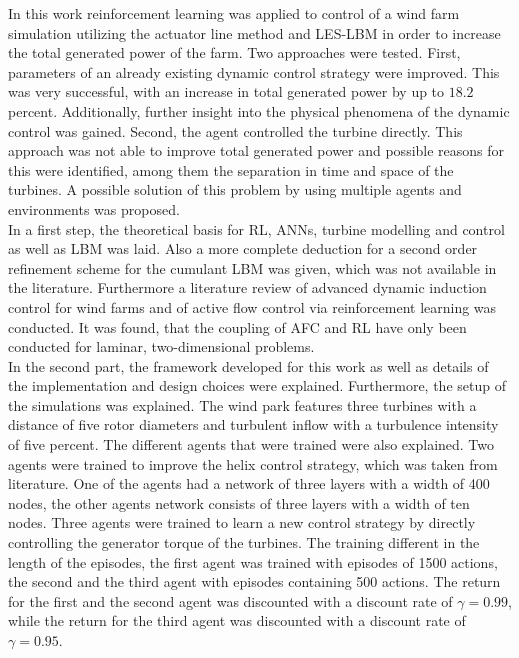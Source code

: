 In this work reinforcement learning was applied to control of a wind farm simulation utilizing the actuator line method and LES-LBM in order to increase the total generated power of the farm. Two approaches were tested. First, parameters of an already existing dynamic control strategy were improved. This was very successful, with an increase in total generated power by up to $18.2$ percent. Additionally, further insight into the physical phenomena of the dynamic control was gained. Second, the agent controlled the turbine directly. This approach was not able to improve total generated power and possible reasons for this were identified, among them the separation in time and space of the turbines. A possible solution of this problem by using multiple agents and environments was proposed. \\
In a first step, the theoretical basis for RL, ANNs, turbine modelling and control as well as LBM was laid. Also a more complete deduction for a second order refinement scheme for the cumulant LBM was given, which was not available in the literature. Furthermore a literature review of advanced dynamic induction control for wind farms and of active flow control via reinforcement learning was conducted. It was found, that the coupling of AFC and RL have only been conducted for laminar, two-dimensional problems. \\
In the second part, the framework developed for this work as well as details of the implementation and design choices were explained. Furthermore, the setup of the simulations was explained. The wind park features three turbines with a distance of five rotor diameters and turbulent inflow with a turbulence intensity of five percent. The different agents that were trained were also explained. Two agents were trained to improve the helix control strategy, which was taken from literature. One of the agents had a network of three layers with a width of 400 nodes, the other agents network consists of three layers with a width of ten nodes. Three agents were trained to learn a new control strategy by directly controlling the generator torque of the turbines. The training different in the length of the episodes, the first agent was trained with episodes of 1500 actions, the second and the third agent with episodes containing 500 actions. The return for the first and the second agent was discounted with a discount rate of $\gamma=0.99$, while the return for the third agent was discounted with a discount rate of $\gamma=0.95$. \\
